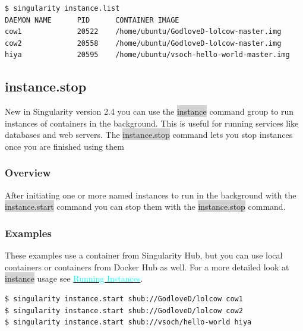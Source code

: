 \documentclass[a4paper]{article}
\newcounter{subsubsubsection}[subsubsection]
\begin{document}
\begin{lstlisting}[frame=single]
$ singularity instance.list
DAEMON NAME      PID      CONTAINER IMAGE
cow1             20522    /home/ubuntu/GodloveD-lolcow-master.img
cow2             20558    /home/ubuntu/GodloveD-lolcow-master.img
hiya             20595    /home/ubuntu/vsoch-hello-world-master.img
\end{lstlisting}

		
\subsection{instance.stop}
\label{sec:instancestop}

New in Singularity version 2.4 you can use the \colorbox{lightgray}{instance}  command group to run instances of containers in the background. This is useful for running services like databases and web servers. The \colorbox{lightgray}{instance.stop} command lets you stop instances once you are finished using them


	\subsubsection{Overview}
	
	After initiating one or more named instances to run in the background with the  \colorbox{lightgray}{instance.start} command you can stop them with the  \colorbox{lightgray}{instance.stop} command.



	\subsubsection{Examples}
	
These examples use a container from Singularity Hub, but you can use local containers or containers from Docker Hub as well. For a more detailed look at \colorbox{lightgray}{instance} usage see \hyperref[sec:instances]{{\textcolor{cyan}{Running Instances}}}.

	
	
		
\begin{lstlisting}[frame=single]
$ singularity instance.start shub://GodloveD/lolcow cow1
$ singularity instance.start shub://GodloveD/lolcow cow2
$ singularity instance.start shub://vsoch/hello-world hiya
\end{lstlisting}
		
\end{document}
